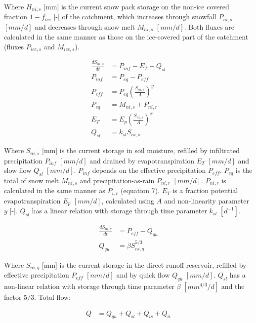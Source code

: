 Where $H_{ni,s}$ [mm] is the current snow pack storage on the non-ice covered fraction $1-f_{ice}$ [-] of the catchment, which increases through snowfall $P_{ni,s}$ $[mm/d]$ and decreases through snow melt $M_{ni,s}$ $[mm/d]$.
Both fluxes are calculated in the same manner as those on the ice-covered part of the catchment (fluxes $P_{ice,s}$ and $M_{ice,s}$).

\begin{align}
	\frac{dS_{ni,s}}{dt} &= P_{inf} - E_T - Q_{sl}\\
	P_{inf} &= P_{eq} -P_{eff} \\
	P_{eff} &= P_{eq}\left(\frac{S_{ni,s}}{A}\right)^y \\	
	P_{eq} &= M_{ni,s} + P_{ni,r} \\
	E_T &= E_p\left( \frac{S_{ni,s}}{A}\right)^x \\
	Q_{sl} &= k_{sl}S_{ni,s}
\end{align}

Where $S_{ni,s}$ [mm] is the current storage in soil moisture, refilled by infiltrated precipitation $P_{inf}$ $[mm/d]$ and drained by evapotranspiration $E_T$ $[mm/d]$ and slow flow $Q_{sl}$ $[mm/d]$.
$P_{inf}$ depends on the effective precipitation $P_{eff}$. 
$P_{eq}$ is the total of snow melt $M_{ni,s}$ and precipitation-as-rain $P_{ni,r}$ $[mm/d]$.
$P_{ni,r}$ is calculated in the same manner as $P_{i,r}$ (equation 7).
$E_T$ is a fraction potential evapotranspiration $E_p$ $[mm/d]$, calculated using $A$ and non-linearity parameter $y$ [-].
$Q_{sl}$ has a linear relation with storage through time parameter $k_{sl}$ $[d^{-1}]$.

\begin{align}
	\frac{dS_{ni,q}}{dt} &= P_{eff} - Q_{qu}\\
	Q_{qu} &= \beta S_{ni,q}^{5/3}
\end{align}

Where $S_{ni,q}$ [mm] is the current storage in the direct runoff reservoir, refilled by effective precipitation $P_{eff}$ $[mm/d]$ and by quick flow $Q_{qu}$ $[mm/d]$.
$Q_{sl}$ has a non-linear relation with storage through time parameter $\beta$ $[mm^{4/3}/d]$ and the factor $5/3$.
Total flow:

\begin{align}
	Q &= Q_{qu}+Q_{sl}+Q_{is}+Q_{ii}
\end{align}

\newpage
